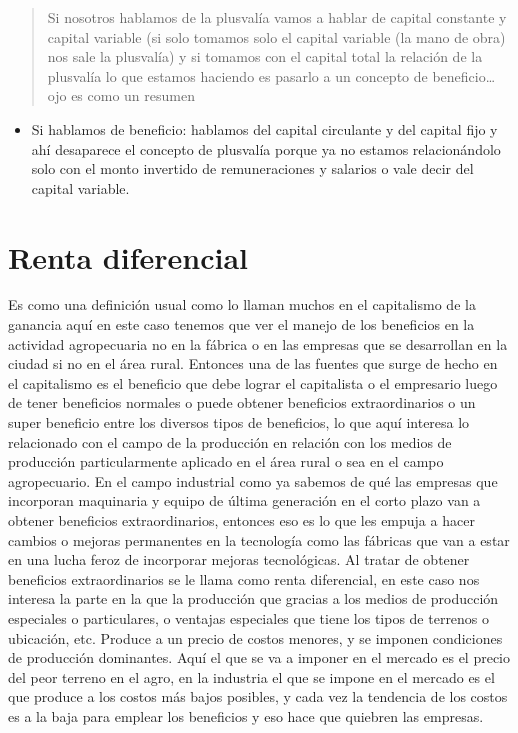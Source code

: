 \documentclass[
  a4paper,
]{article}
\providecommand{\tightlist}{%
  \setlength{\itemsep}{0pt}\setlength{\parskip}{0pt}}\usepackage{longtable,booktabs,array}
\begin{document}
\begin{quote}
Si nosotros hablamos de la plusvalía vamos a hablar de capital constante
y capital variable (si solo tomamos solo el capital variable (la mano de
obra) nos sale la plusvalía) y si tomamos con el capital total la
relación de la plusvalía lo que estamos haciendo es pasarlo a un
concepto de beneficio\ldots ojo es como un resumen
\end{quote}

\begin{itemize}
\tightlist
\item
  Si hablamos de beneficio: hablamos del capital circulante y del
  capital fijo y ahí desaparece el concepto de plusvalía porque ya no
  estamos relacionándolo solo con el monto invertido de remuneraciones y
  salarios o vale decir del capital variable.
\end{itemize}

\hypertarget{renta-diferencial}{%
\section{Renta diferencial}\label{renta-diferencial}}

Es como una definición usual como lo llaman muchos en el capitalismo de
la ganancia aquí en este caso tenemos que ver el manejo de los
beneficios en la actividad agropecuaria no en la fábrica o en las
empresas que se desarrollan en la ciudad si no en el área rural.
Entonces una de las fuentes que surge de hecho en el capitalismo es el
beneficio que debe lograr el capitalista o el empresario luego de tener
beneficios normales o puede obtener beneficios extraordinarios o un
super beneficio entre los diversos tipos de beneficios, lo que aquí
interesa lo relacionado con el campo de la producción en relación con
los medios de producción particularmente aplicado en el área rural o sea
en el campo agropecuario. En el campo industrial como ya sabemos de qué
las empresas que incorporan maquinaria y equipo de última generación en
el corto plazo van a obtener beneficios extraordinarios, entonces eso es
lo que les empuja a hacer cambios o mejoras permanentes en la tecnología
como las fábricas que van a estar en una lucha feroz de incorporar
mejoras tecnológicas. Al tratar de obtener beneficios extraordinarios se
le llama como renta diferencial, en este caso nos interesa la parte en
la que la producción que gracias a los medios de producción especiales o
particulares, o ventajas especiales que tiene los tipos de terrenos o
ubicación, etc. Produce a un precio de costos menores, y se imponen
condiciones de producción dominantes. Aquí el que se va a imponer en el
mercado es el precio del peor terreno en el agro, en la industria el que
se impone en el mercado es el que produce a los costos más bajos
posibles, y cada vez la tendencia de los costos es a la baja para
emplear los beneficios y eso hace que quiebren las empresas.
\end{document}
